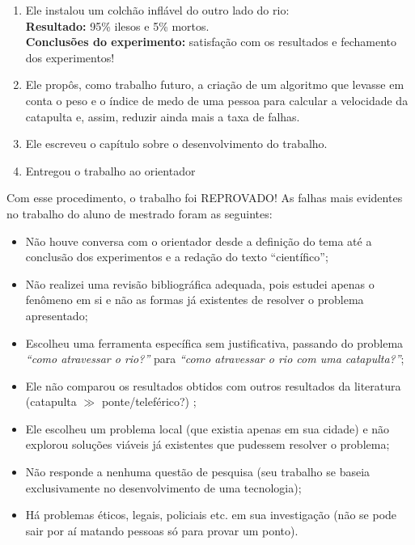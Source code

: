 \documentclass[12pt,a4paper]{article}
\begin{document}
\begin{enumerate}
\begin{enumerate}[label=\alph*)]
\begin{itemize}
                \end{itemize}  
        \textbf{Conclusões do experimento:} As chances de sobrevivência aumentam de 5\% para 50\%!
        \item Ele instalou um colchão inflável do outro lado do rio:\\
                \textbf{Resultado:} 95\% ilesos e 5\% mortos.\\ 
        \textbf{Conclusões do experimento:} satisfação com os resultados e fechamento dos experimentos!
        \item Ele propôs, como trabalho futuro, a criação de um algoritmo que levasse em conta o peso e o índice de medo de uma pessoa para calcular a velocidade da catapulta e,
         assim, reduzir ainda mais a taxa de falhas.
         \item Ele escreveu o capítulo sobre o desenvolvimento do trabalho.
         \item Entregou o trabalho ao orientador
    \end{enumerate}
    Com esse procedimento, o trabalho foi REPROVADO! As falhas mais evidentes no trabalho do aluno de mestrado foram as seguintes:

    \begin{itemize}
        \item Não houve conversa com o orientador desde a definição do tema até a conclusão dos experimentos e a redação do texto “científico”;
        \item Não realizei uma revisão bibliográfica adequada, pois estudei apenas o fenômeno em si e não as formas já existentes de resolver o problema apresentado;
        \item Escolheu uma ferramenta específica sem justificativa, passando do problema \textit{“como atravessar o rio?”} para \textit{“como atravessar o rio com uma catapulta?”};
        \item Ele não comparou os resultados obtidos com outros resultados da literatura (catapulta $\gg$ ponte/teleférico?)  ;      
        \item Ele escolheu um problema local (que existia apenas em sua cidade) e não explorou soluções viáveis já existentes que pudessem resolver o problema;
        \item Não responde a nenhuma questão de pesquisa (seu trabalho se baseia exclusivamente no desenvolvimento de uma tecnologia);
        \item Há problemas éticos, legais, policiais etc. em sua investigação (não se pode sair por aí matando pessoas só para provar um ponto).
    \end{itemize}
    

\end{enumerate}
\end{document}
